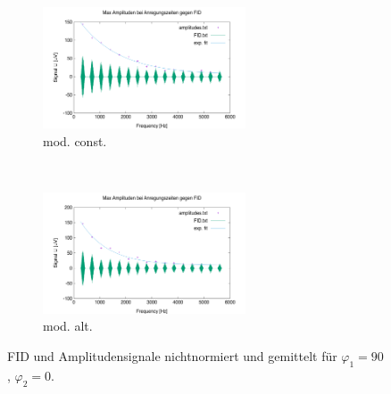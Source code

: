 \documentclass[../../main.tex]{subfiles}
\begin{document}
        \begin{figure}[H]
            \centering
            \begin{subfigure}[b]{0.4\textwidth}
                \centering
                \includegraphics[width=6cm]{Bilddateien/10/CPMG-90-0-constant-avg.png}
                \caption{mod. const.}
                \label{fig:CPMG-90-0-constant-avg}
            \end{subfigure}
            \
            \begin{subfigure}[b]{0.4\textwidth}
                \centering
                \includegraphics[width=6cm]{Bilddateien/10/CPMG-90-0-alternating-avg.png}
                \caption{mod. alt.}
                \label{fig:CPMG-90-0-alternating-avg}
            \end{subfigure}
            \caption{FID und Amplitudensignale nichtnormiert und gemittelt für $\varphi_1 = 90$, $\varphi_2 = 0$.}
            \label{fig:CPMG-90-0-avg}
        \end{figure}
\end{document}
